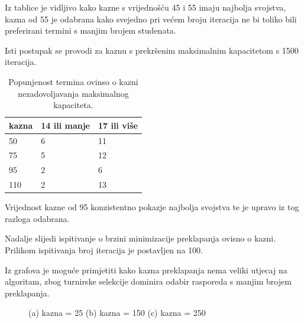 \documentclass[times, utf8, zavrsni]{fer}
\begin{document}
Iz tablice je vidljivo kako kazne s vrijednošću 45 i 55 imaju najbolja svojstva, kazna od 55 je odabrana kako svejedno pri većem broju iteracija ne bi toliko bili preferirani termini s manjim brojem studenata.

Isti postupak se provodi za kaznu s prekršenim maksimalnim kapacitetom s 1500 iteracija.

\begin{table}[htb]
\caption{Popunjenost termina ovinso o kazni nezadovoljavanja maksimalnog kapaciteta.}
\label{tbl:max-popunjenost}
\centering
\begin{tabular}{lll} \hline
kazna & 14 ili manje &  17 ili više \\ \hline
50 & 6  & 11  \\
75 & 5 & 12 \\
95 & 2 & 6 \\
110 & 2 & 13 \\ \hline
\end{tabular}
\end{table}

Vrijednost kazne od 95 konzistentno pokazje najbolja svojstva te je upravo iz tog razloga odabrana.

Nadalje slijedi ispitivanje o brzini minimizacije preklapanja ovisno o kazni.  Prilikom ispitivanja broj iteracija je postavljen na 100.

Iz grafova je moguće primjetiti kako kazna preklapanja nema veliki utjecaj na algoritam, zbog turnirske selekcije dominira odabir rasporeda s manjim brojem preklapanja.

\begin{figure}
    \centering
    \caption{(a) kazna = 25 (b) kazna = 150 (c) kazna = 250}
    \label{fig:kazne}
\end{figure}
\newpage
\end{document}
